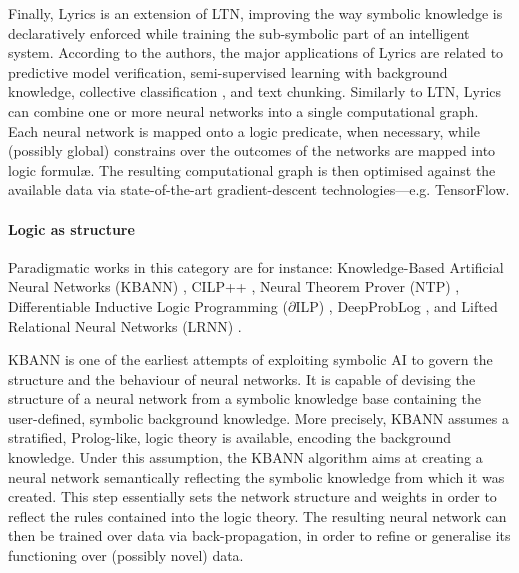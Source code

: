 \documentclass[12pt,a4paper,openright,twoside]{book}
\begin{document}
Finally, Lyrics \cite{marra2019lyrics} is an extension of LTN, improving the way symbolic knowledge is declaratively enforced while training the sub-symbolic part of an intelligent system.
%
According to the authors, the major applications of Lyrics are related to predictive model verification, semi-supervised learning with background knowledge, collective classification \cite{SenNBGGE08}, and text chunking.
%
Similarly to LTN, Lyrics can combine one or more neural networks into a single computational graph.
%
Each neural network is mapped onto a logic predicate, when necessary, while (possibly global) constrains over the outcomes of the networks are mapped into logic formul\ae{}.
%
The resulting computational graph is then optimised against the available data via state-of-the-art gradient-descent technologies---e.g. TensorFlow.

\paragraph{Logic as structure}

Paradigmatic works in this category are for instance: Knowledge-Based Artificial Neural Networks (KBANN) \cite{Towell1990}, CILP++ \cite{Franca2014}, Neural Theorem Prover (NTP) \cite{rocktaschel2017}, Differentiable Inductive Logic Programming ($\partial$ILP) \cite{EvansG18}, DeepProbLog \cite{Manhaeve2018}, and Lifted Relational Neural Networks (LRNN) \cite{SourekAZSK18}.

KBANN \cite{Towell1990} is one of the earliest attempts of exploiting symbolic AI to govern the structure and the behaviour of neural networks.
%
It is capable of devising the structure of a neural network from a symbolic knowledge base containing the user-defined, symbolic background knowledge.
%
More precisely, KBANN assumes a stratified, Prolog-like, logic theory is available, encoding the background knowledge.
%
Under this assumption, the KBANN algorithm aims at creating a neural network semantically reflecting the symbolic knowledge from which it was created.
%
This step essentially sets the network structure and weights in order to reflect the rules contained into the logic theory.
%
The resulting neural network can then be trained over data via back-propagation, in order to refine or generalise its functioning over (possibly novel) data.
%
%
\end{document}
